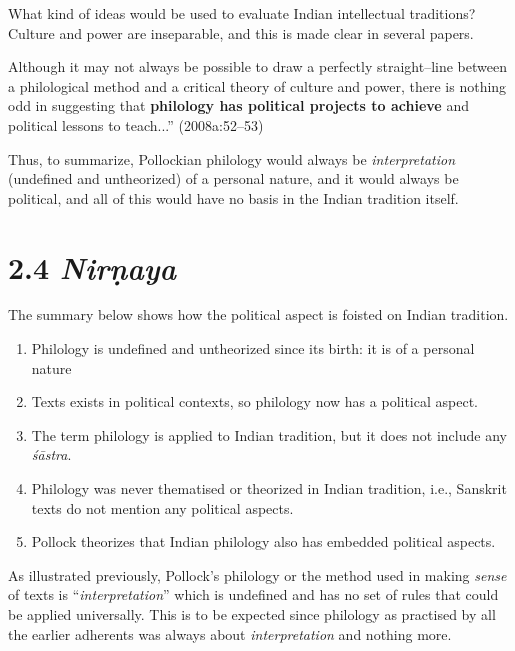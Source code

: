 What kind of ideas would be used to evaluate Indian intellectual traditions? Culture and power are inseparable, and this is made clear in several papers.

\begin{myquote}
Although it may not always be possible to draw a perfectly straight–line between a philological method and a critical theory of culture and power, there is nothing odd in suggesting that \textbf{philology has political projects to achieve} and political lessons to teach...” (2008a:52–53)
\end{myquote}

Thus, to summarize, Pollockian philology would always be \textit{interpretation} (undefined and untheorized) of a personal nature, and it would always be political, and all of this would have no basis in the Indian tradition itself.

\vspace{-.3cm}

\section*{2.4 {\it {\bfseries Nirṇaya}}}

\vspace{-.2cm}

The summary below shows how the political aspect is foisted on Indian tradition.

\begin{enumerate}
\itemsep=0pt
\item Philology is undefined and untheorized since its birth: it is of a personal nature

 \item Texts exists in political contexts, so philology now has a political aspect.

 \item The term philology is applied to Indian tradition, but it does not include any\textit{ śāstra}.

 \item Philology was never thematised or theorized in Indian tradition, i.e., Sanskrit texts do not mention any political aspects.

 \item Pollock theorizes that Indian philology also has embedded political aspects.

\end{enumerate}

As illustrated previously, Pollock’s philology or the method used in making \textit{sense} of texts is “\textit{interpretation}” which is undefined and has no set of rules that could be applied universally. This is to be expected since philology as practised by all the earlier adherents was always about \textit{interpretation} and nothing more.

